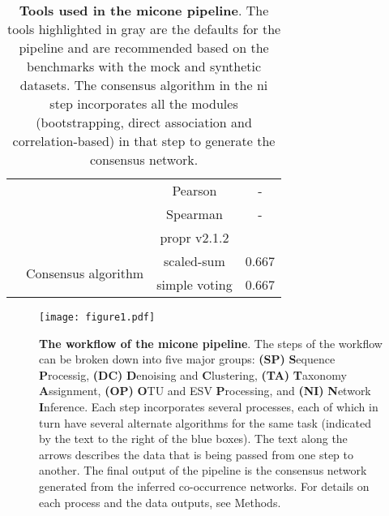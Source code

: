 \begin{table}[H]
\begin{tabular}{|c|c|c|c|}
                                          & & Pearson & - \\
                                          & & Spearman & - \\
                                          & & propr v2.1.2 & \cite{quinnProprRpackageIdentifying2017} \\ \cline{2-4}
                                          & \multirow{2}{*}{Consensus algorithm} & \rowcolor{lightgray} scaled-sum & 0.667 \\
                                          & & simple voting & 0.667 \\
      \hline
    \end{tabular}
    \caption{
      \textbf{Tools used in the \ac{micone} pipeline}.
      The tools highlighted in gray are the defaults for the pipeline and are recommended based on the benchmarks with the mock and synthetic datasets.
      The consensus algorithm in the \ac{ni} step incorporates all the modules (bootstrapping, direct association and correlation-based) in that step to generate the consensus network.
    }
    \label{tab:micone_tools}
  \end{table}

  \FloatBarrier
  \newpage

  \begin{figure}[H]
    \centering
    \texttt{[image: figure1.pdf]}
  \end{figure}
  \begin{figure}[H]
    \centering
    \caption{
      \textbf{The workflow of the \ac{micone} pipeline}.
      The steps of the workflow can be broken down into five major groups: \textbf{(SP)} \textbf{S}equence \textbf{P}rocessig, \textbf{(DC)} \textbf{D}enoising and \textbf{C}lustering, \textbf{(TA)} \textbf{T}axonomy \textbf{A}ssignment, \textbf{(OP)} \textbf{O}TU and ESV \textbf{P}rocessing, and \textbf{(NI)} \textbf{N}etwork \textbf{I}nference.
      Each step incorporates several processes, each of which in turn have several alternate algorithms for the same task (indicated by the text to the right of the blue boxes).
      The text along the arrows describes the data that is being passed from one step to another.
      The final output of the pipeline is the consensus network generated from the inferred co-occurrence networks.
      For details on each process and the data outputs, see Methods.
    }
    \label{fig:figure1}
  \end{figure}

  \FloatBarrier
  \newpage

